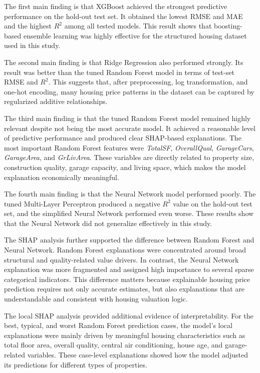 \documentclass[12pt,a4paper,oneside,openany]{book}
\begin{document}
The first main finding is that XGBoost achieved the strongest predictive performance on the hold-out test set. It obtained the lowest RMSE and MAE and the highest $R^2$ among all tested models. This result shows that boosting-based ensemble learning was highly effective for the structured housing dataset used in this study.

The second main finding is that Ridge Regression also performed strongly. Its result was better than the tuned Random Forest model in terms of test-set RMSE and $R^2$. This suggests that, after preprocessing, log transformation, and one-hot encoding, many housing price patterns in the dataset can be captured by regularized additive relationships.

The third main finding is that the tuned Random Forest model remained highly relevant despite not being the most accurate model. It achieved a reasonable level of predictive performance and produced clear SHAP-based explanations. The most important Random Forest features were \textit{TotalSF}, \textit{OverallQual}, \textit{GarageCars}, \textit{GarageArea}, and \textit{GrLivArea}. These variables are directly related to property size, construction quality, garage capacity, and living space, which makes the model explanation economically meaningful.

The fourth main finding is that the Neural Network model performed poorly. The tuned Multi-Layer Perceptron produced a negative $R^2$ value on the hold-out test set, and the simplified Neural Network performed even worse. These results show that the Neural Network did not generalize effectively in this study.

The SHAP analysis further supported the difference between Random Forest and Neural Network. Random Forest explanations were concentrated around broad structural and quality-related value drivers. In contrast, the Neural Network explanation was more fragmented and assigned high importance to several sparse categorical indicators. This difference matters because explainable housing price prediction requires not only accurate estimates, but also explanations that are understandable and consistent with housing valuation logic.

The local SHAP analysis provided additional evidence of interpretability. For the best, typical, and worst Random Forest prediction cases, the model's local explanations were mainly driven by meaningful housing characteristics such as total floor area, overall quality, central air conditioning, house age, and garage-related variables. These case-level explanations showed how the model adjusted its predictions for different types of properties.
\end{document}
